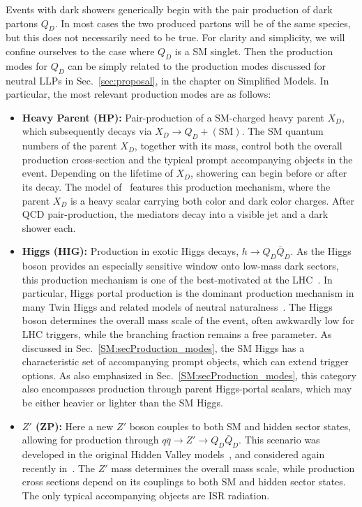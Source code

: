 Events with dark showers generically begin with the pair production of dark partons $Q_D$. In most cases the two produced partons will be of the same species, but this does not necessarily need to be true. For clarity and simplicity, we will confine ourselves to the case where $Q_D$ is a SM singlet. Then the production modes for $Q_D$ can be simply related to the production modes discussed for neutral LLPs in Sec.~\ref{sec:proposal}, in the chapter on Simplified Models. In particular, the most relevant production modes are as follows:
%
\begin{itemize}

\item {\bf Heavy Parent (HP):} Pair-production of a SM-charged heavy parent $X_D$, which subsequently decays via $X_D\to Q_D+\mathrm{(SM)}$. The SM quantum numbers of the parent $X_D$, together with its mass, control both the overall production cross-section and the typical prompt accompanying objects in the event. Depending on the lifetime of $X_D$, showering can begin before or after its decay. The model of~\cite{Schwaller:2015gea} features this production mechanism, where the parent $X_D$ is a heavy scalar carrying both color and dark color charges. After QCD pair-production, the mediators decay into a visible jet and a dark shower each.

\item {\bf Higgs (HIG):} Production in exotic Higgs decays, $h\to Q_D\bar Q_D$. As the Higgs boson provides an especially sensitive window onto low-mass dark sectors, this production mechanism is one of the best-motivated at the LHC~\cite{Strassler:2006ri,Curtin:2013fra}. In particular, Higgs portal production is the dominant production mechanism in many Twin Higgs and related models of neutral naturalness~\cite{Craig:2015pha,Craig:2016kue,Curtin:2015fna}. The Higgs boson determines the overall mass scale of the event, often awkwardly low for LHC triggers, while the branching fraction remains a free parameter. As discussed in Sec.~\ref{SM:secProduction_modes}, the SM Higgs has a characteristic set of accompanying prompt objects, which can extend trigger options. As also emphasized in Sec.~\ref{SM:secProduction_modes}, this category also encompasses production through parent Higgs-portal scalars, which may be either heavier or lighter than the SM Higgs.

\item {\bf $Z'$ (ZP):} Here a new $Z'$ boson couples to both SM and hidden sector states, allowing for production through $q\bar q \to Z'\to Q_D\bar Q_D$. This scenario was developed in the original Hidden Valley models~\cite{Strassler:2006im,Han:2007ae}, and considered again recently in~\cite{Cohen:2015toa}. The $Z'$ mass determines the overall mass scale, while production cross sections depend on its couplings to both SM and hidden sector states. The only typical accompanying objects are ISR radiation.


\end{itemize}

